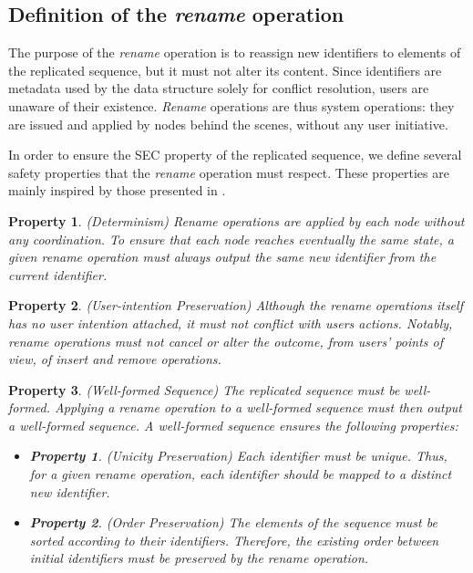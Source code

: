 \documentclass[10pt,journal,compsoc]{IEEEtran}
\newtheorem{property}{Property}
\newtheorem{subproperty}{Property}[property]
\begin{document}
\subsection{Definition of the \emph{rename} operation}

\label{sec:definition-rename-operation}

The purpose of the \emph{rename} operation is to reassign new identifiers to elements of the replicated sequence, but it must not alter its content.
Since identifiers are metadata used by the data structure solely for conflict resolution, users are unaware of their existence.
\emph{Rename} operations are thus system operations: they are issued and applied by nodes behind the scenes, without any user initiative.

In order to ensure the \ac{SEC} property of the replicated sequence, we define several safety properties that the \emph{rename} operation must respect.
These properties are mainly inspired by those presented in \cite{zawirski:hal-01248197}.

\begin{property}(Determinism)
    \emph{Rename} operations are applied by each node without any coordination.
    To ensure that each node reaches eventually the same state, a given \emph{rename} operation must always output the same new identifier from the current identifier.
\end{property}

\begin{property}(User-intention Preservation)
    Although the \emph{rename} operations itself has no user intention attached, it must not conflict with users actions.
    Notably, \emph{rename} operations must not cancel or alter the outcome, from users' points of view, of \emph{insert} and \emph{remove} operations.
\end{property}

\begin{property}(Well-formed Sequence)
    The replicated sequence must be well-formed.
    Applying a \emph{rename} operation to a well-formed sequence must then output a well-formed sequence.
    A well-formed sequence ensures the following properties:
    \begin{itemize}[noitemsep]
        \item[~]
        \begin{subproperty}(Unicity Preservation)
            Each identifier must be unique.
            Thus, for a given \emph{rename} operation, each identifier should be mapped to a distinct new identifier.
        \end{subproperty}
        \item[~]
        \begin{subproperty}(Order Preservation)
            The elements of the sequence must be sorted according to their identifiers.
            Therefore, the existing order between initial identifiers must be preserved by the \emph{rename} operation.
        \end{subproperty}
    \end{itemize}
\end{property}
\end{document}
